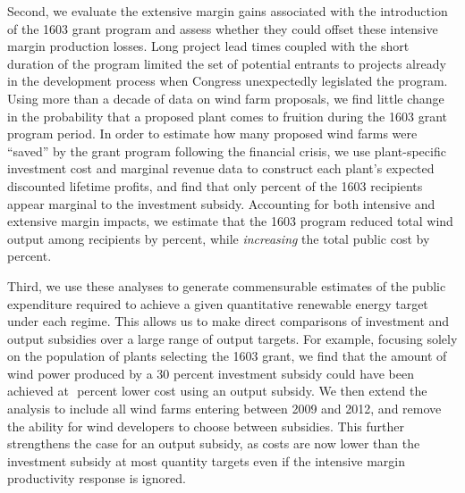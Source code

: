 \documentclass[12pt]{article}
\begin{document}
Second, we evaluate the extensive margin gains associated with the introduction of the 1603 grant program and assess whether they could offset these intensive margin production losses. Long project lead times coupled with the short duration of the program limited the set of potential entrants to projects already in the development process when Congress unexpectedly legislated the program. Using more than a decade of data on wind farm proposals, we find little change in the probability that a proposed plant comes to fruition during the 1603 grant program period. In order to estimate how many proposed wind farms were ``saved'' by the grant program following the financial crisis, we use plant-specific investment cost and marginal revenue data to construct each plant's expected discounted lifetime profits, and find that only  \unskip percent of the 1603 recipients appear marginal to the investment subsidy. Accounting for both intensive and extensive margin impacts, we estimate that the 1603 program reduced total wind output among recipients by  \unskip percent, while \emph{increasing} the total public cost by  \unskip percent.

Third, we use these analyses to generate commensurable estimates of the public expenditure required to achieve a given quantitative renewable energy target under each regime. This allows us to make direct comparisons of investment and output subsidies over a large range of output targets. For example, focusing solely on the population of plants selecting the 1603 grant, we find that the amount of wind power produced by a 30 percent investment subsidy could have been achieved at $$ percent lower cost using an output subsidy. We then extend the analysis to include all wind farms entering between 2009 and 2012, and remove the ability for wind developers to choose between subsidies. This further strengthens the case for an output subsidy, as costs are now lower than the investment subsidy at most quantity targets even if the intensive margin productivity response is ignored. 
\end{document}
